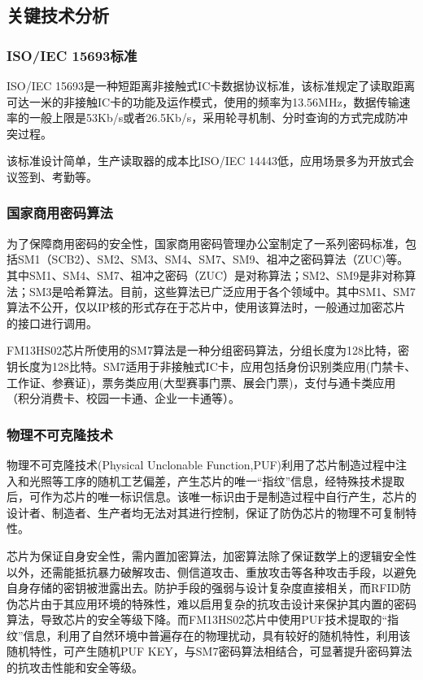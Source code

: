 \documentclass[a4paper]{ctexart}
\begin{document}
\begin{spacing}{1.5}
\subsection{关键技术分析}
\subsubsection{ISO/IEC 15693标准}
ISO/IEC 15693是一种短距离非接触式IC卡数据协议标准，该标准规定了读取距离可达一米的非接触IC卡的功能及运作模式，使用的频率为13.56MHz，数据传输速率的一般上限是53Kb/s或者26.5Kb/s，采用轮寻机制、分时查询的方式完成防冲突过程。

该标准设计简单，生产读取器的成本比ISO/IEC 14443低，应用场景多为开放式会议签到、考勤等。

\subsubsection{国家商用密码算法}
为了保障商用密码的安全性，国家商用密码管理办公室制定了一系列密码标准\cite{RN100}，包括SM1（SCB2）、SM2、SM3、SM4、SM7、SM9、祖冲之密码算法（ZUC)等。其中SM1、SM4、SM7、祖冲之密码（ZUC）是对称算法；SM2、SM9是非对称算法；SM3是哈希算法。目前，这些算法已广泛应用于各个领域中。其中SM1、SM7算法不公开，仅以IP核的形式存在于芯片中，使用该算法时，一般通过加密芯片的接口进行调用。

FM13HS02芯片所使用的SM7算法是一种分组密码算法，分组长度为128比特，密钥长度为128比特\cite{RN101}。SM7适用于非接触式IC卡，应用包括身份识别类应用(门禁卡、工作证、参赛证)，票务类应用(大型赛事门票、展会门票)，支付与通卡类应用（积分消费卡、校园一卡通、企业一卡通等）。

\subsubsection{物理不可克隆技术}
物理不可克隆技术(Physical Unclonable Function,PUF)利用了芯片制造过程中注入和光照等工序的随机工艺偏差，产生芯片的唯一“指纹”信息，经特殊技术提取后，可作为芯片的唯一标识信息。该唯一标识由于是制造过程中自行产生，芯片的设计者、制造者、生产者均无法对其进行控制，保证了防伪芯片的物理不可复制特性。

芯片为保证自身安全性，需内置加密算法，加密算法除了保证数学上的逻辑安全性以外，还需能抵抗暴力破解攻击、侧信道攻击、重放攻击等各种攻击手段，以避免自身存储的密钥被泄露出去。防护手段的强弱与设计复杂度直接相关，而RFID防伪芯片由于其应用环境的特殊性，难以启用复杂的抗攻击设计来保护其内置的密码算法，导致芯片的安全等级下降\cite{RN103}。而FM13HS02芯片中使用PUF技术提取的“指纹”信息，利用了自然环境中普遍存在的物理扰动，具有较好的随机特性，利用该随机特性，可产生随机PUF KEY\cite{RN105}，与SM7密码算法相结合，可显著提升密码算法的抗攻击性能和安全等级\cite{RN102}。


\end{spacing}
\end{document}
